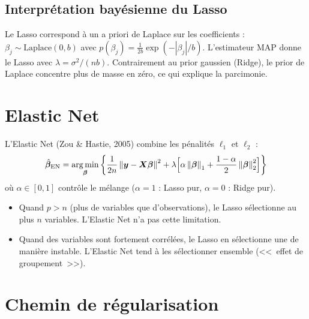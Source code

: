 \subsection{Interpr\'etation bay\'esienne du Lasso}

\begin{remarque}
Le Lasso correspond \`a un a priori de Laplace sur les coefficients :
$\beta_j \sim \text{Laplace}(0, b)$ avec $p(\beta_j) = \frac{1}{2b}\exp(-|\beta_j|/b)$.
L'estimateur MAP donne le Lasso avec $\lambda = \sigma^2 / (nb)$.
Contrairement au prior gaussien (Ridge), le prior de Laplace concentre plus de masse
en z\'ero, ce qui explique la parcimonie.
\end{remarque}

\section{Elastic Net}
\label{sec:elastic-net}

\begin{definition}
L'Elastic Net (Zou \& Hastie, 2005) combine les p\'enalit\'es $\ell_1$ et $\ell_2$ :
\[
  \hat{\bm{\beta}}_{\text{EN}} = \operatorname*{arg\,min}_{\bm{\beta}} \left\{
    \frac{1}{2n}\left\| \bm{y} - \bm{X}\bm{\beta} \right\|^2
    + \lambda \Bigl[\alpha \left\| \bm{\beta} \right\|_1 + \frac{1-\alpha}{2}\left\| \bm{\beta} \right\|_2^2\Bigr]
  \right\}
\]
o\`u $\alpha \in [0, 1]$ contr\^ole le m\'elange ($\alpha = 1$ : Lasso pur,
$\alpha = 0$ : Ridge pur).
\end{definition}

\begin{bonnepratique}[title=\textbf{Quand utiliser l'Elastic Net}]
\begin{itemize}
  \item Quand $p > n$ (plus de variables que d'observations), le Lasso s\'electionne
        au plus $n$ variables. L'Elastic Net n'a pas cette limitation.
  \item Quand des variables sont fortement corr\'el\'ees, le Lasso en s\'electionne
        une de mani\`ere instable. L'Elastic Net tend \`a les s\'electionner ensemble
        (<<~effet de groupement~>>).
\end{itemize}
\end{bonnepratique}

\section{Chemin de r\'egularisation}
\label{sec:regularization-path}

